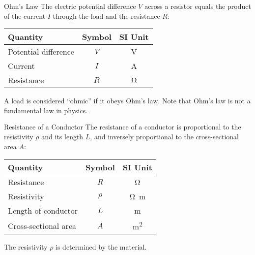 \documentclass[12pt,aspectratio=169]{beamer}
\begin{document}
\begin{frame}{Ohm's Law}
  The electric potential difference $V$ across a resistor equals the product of
  the current $I$ through the load and the resistance $R$:

  \begin{center}
    \begin{tabular}{l|c|c}
      \rowcolor{pink}
      \textbf{Quantity} & \textbf{Symbol} & \textbf{SI Unit} \\ \hline
      Potential difference & $V$    & \si\volt \\
      Current              & $I$    & \si\ampere \\
      Resistance           & $R$    & \si\ohm
    \end{tabular}
  \end{center}
  A load is considered ``ohmic'' if it obeys Ohm's law. Note that Ohm's law
  is not a fundamental law in physics.
\end{frame}



\begin{frame}{Resistance of a Conductor}
  The resistance of a conductor is proportional to the resistivity $\rho$ and
  its length $L$, and inversely proportional to the cross-sectional area $A$:

  \begin{center}
    \begin{tabular}{l|c|c}
      \rowcolor{pink}
      \textbf{Quantity} & \textbf{Symbol} & \textbf{SI Unit} \\ \hline
      Resistance           & $R$    & \si\ohm \\
      Resistivity          & $\rho$ & \si{\ohm\metre}\\
      Length of conductor  & $L$    & \si\metre \\
      Cross-sectional area & $A$    & \si{\metre\squared}
    \end{tabular}
  \end{center}
  The resistivity $\rho$ is determined by the material.
\end{frame}



%
\end{document}
